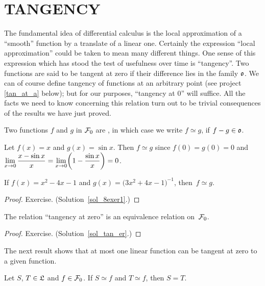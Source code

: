 \section{TANGENCY}
The fundamental idea of differential calculus is the local approximation of a ``smooth''
function by a translate of a linear one. Certainly the expression ``local approximation''
could be taken to mean many different things. One sense of this expression which has stood the
test of usefulness over time is ``tangency''. Two functions are said to be tangent at zero if
their difference lies in the family $\mathfrak{o}$. We can of course define tangency of functions
at an arbitrary  point (see project \ref{tan_at_a} below); but for our purposes, ``tangency at
0'' will suffice. All the facts we need to know concerning this relation turn out to be
trivial consequences of the results we have just proved.

\begin{defn} Two functions $f$ and $g$ in $\mathcal{F}_0$ are
, in which case we write
$f \simeq g$, if $f - g \in \mathfrak{o}$.
\end{defn}

\begin{exam} Let $f(x) = x$ and $g(x) = \sin x$. Then $f \simeq g$ since $f(0) = g(0) = 0$ and
$\lim\limits_{x \rightarrow 0} \dfrac{x - \sin x}x = \lim\limits_{x \rightarrow 0}\biggl(1 - \dfrac{\sin
x}x\biggr) = 0$.
\end{exam}

\begin{exam}\label{8exer1} If $f(x) = x^2 - 4x - 1$ and $g(x) = \bigl(3x^2 + 4x - 1\bigr)^{-1}$,
then~$f \simeq g$.
\end{exam}

\begin{proof} Exercise.   (Solution~\ref{sol_8exer1}.)
  \ns \end{proof}

\begin{prop}\label{tan_er} The relation ``tangency at zero'' is an equivalence relation
on~$\mathcal{F}_0$.
\end{prop}

\begin{proof} Exercise.  (Solution~\ref{sol_tan_er}.)   \ns \end{proof}

The next result shows that at most one linear function can be tangent at zero to a given
function.

\begin{prop}\label{tan_uniq} Let $S$, $T \in \mathfrak{L}$ and $f \in \mathcal{F}_0$. If $S \simeq f$
and $T \simeq f$, then $S = T$.
\end{prop}

